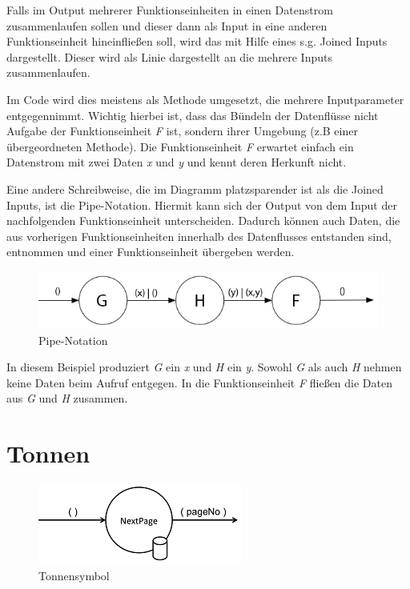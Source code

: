 Falls im Output mehrerer Funktionseinheiten in einen Datenstrom zusammenlaufen
sollen und dieser dann als Input in eine anderen Funktionseinheit hineinfließen
soll, wird das mit Hilfe eines s.g. Joined Inputs dargestellt. 
Dieser wird als Linie dargestellt an die mehrere Inputs zusammenlaufen.

Im Code wird dies meistens als Methode umgesetzt, die mehrere Inputparameter entgegennimmt.
Wichtig hierbei ist, dass das Bündeln der Datenflüsse nicht Aufgabe der
Funktionseinheit \textit{F} ist, sondern ihrer Umgebung (z.B einer übergeordneten Methode).
Die Funktionseinheit \textit{F} erwartet einfach ein Datenstrom mit zwei Daten \textit{x} und \textit{y}
und kennt deren Herkunft nicht.

\bigskip
Eine andere Schreibweise, die im Diagramm platzsparender ist als die Joined Inputs, ist die Pipe-Notation.
Hiermit kann sich der Output von dem Input der nachfolgenden Funktionseinheit unterscheiden.
Dadurch können auch Daten, die aus vorherigen Funktionseinheiten innerhalb des Datenflusses entstanden sind, entnommen und einer Funktionseinheit
übergeben werden.

\begin{figure}[H]
	\centering
	\includegraphics[width=\linewidth]{./img/diagramPipe.jpg}
	\caption{Pipe-Notation}
\end{figure}

In diesem Beispiel produziert \textit{G} ein \textit{x} und \textit{H} ein \textit{y}. Sowohl \textit{G} als auch \textit{H} nehmen keine Daten beim Aufruf entgegen.
In die Funktionseinheit \textit{F} fließen die Daten aus \textit{G} und \textit{H} zusammen.

\section{Tonnen}

\begin{figure}[H]
	\centering
		\includegraphics[width=.7\linewidth]{./img/diagramTonne.png}
	\caption{Tonnensymbol}
\end{figure}



